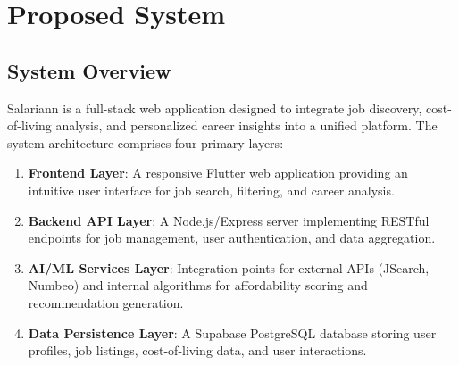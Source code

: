 \documentclass[12pt,a4paper,oneside]{report}
\begin{document}
\chapter{Proposed System}

\section{System Overview}

Salariann is a full-stack web application designed to integrate job discovery, cost-of-living analysis, and personalized career insights into a unified platform. The system architecture comprises four primary layers:

\begin{enumerate}
    \item \textbf{Frontend Layer}: A responsive Flutter web application providing an intuitive user interface for job search, filtering, and career analysis.
    
    \item \textbf{Backend API Layer}: A Node.js/Express server implementing RESTful endpoints for job management, user authentication, and data aggregation.
    
    \item \textbf{AI/ML Services Layer}: Integration points for external APIs (JSearch, Numbeo) and internal algorithms for affordability scoring and recommendation generation.
    
    \item \textbf{Data Persistence Layer}: A Supabase PostgreSQL database storing user profiles, job listings, cost-of-living data, and user interactions.
\end{enumerate}
\end{document}
